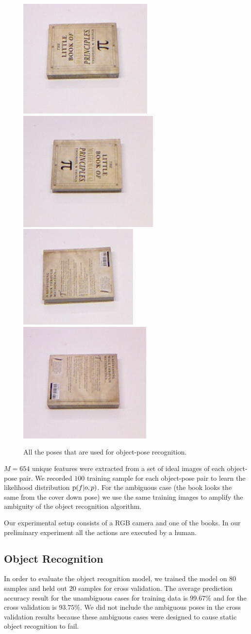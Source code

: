     
     \begin{figure}
     \centering
    		\includegraphics[width = 0.2\columnwidth]{pics/math_cover1.jpg}
    		\includegraphics[width = 0.2\columnwidth]{pics/math_cover1_rot.jpg}
    		\includegraphics[width = 0.2\columnwidth]{pics/math_down.jpg}
    		\includegraphics[width = 0.2\columnwidth]{pics/math_down_rot.jpg}
    		\caption{All the poses that are used for object-pose recognition.}
	\label{fig:pose_dataset}
    \end{figure}       
    
    
$M = 654$ unique features were extracted from a set of ideal images of each object-pose pair. We recorded $100$ training sample for each object-pose pair to learn the likelihood distribution $\text{p}(f|o,p)$. For the ambiguous case (the book looks the same from the cover down pose) we use the same training images to amplify the ambiguity of the object recognition algorithm.

    Our experimental setup consists of a RGB camera and one of the books. In our preliminary experiment all the actions are executed by a human.

    \subsection{Object Recognition}
    
	In order to evaluate the object recognition model, we trained the model on $80$ samples and held out $20$ samples for cross validation. The average prediction accuracy result for the unambiguous cases for training data is $99.67\%$ and for the cross validation is $93.75\%$. We did not include the ambiguous poses in the cross validation results because these ambiguous cases were designed to cause static object recognition to fail.    
    
